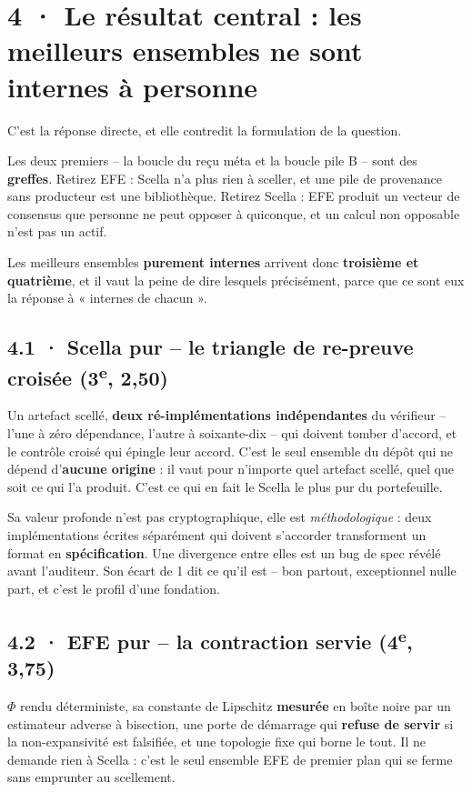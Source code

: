 \documentclass[10pt]{article}
\newcommand{\sz}[1]{{\small\color{grey}\textsf{#1}}}
\begin{document}
\section{4 · Le résultat central : les meilleurs ensembles ne sont internes à personne}

C'est la réponse directe, et elle contredit la formulation de la question.

Les deux premiers -- la boucle du reçu méta et la boucle pile B -- sont des \textbf{greffes}. Retirez
EFE : Scella n'a plus rien à sceller, et une pile de provenance sans producteur est une bibliothèque.
Retirez Scella : EFE produit un vecteur de consensus que personne ne peut opposer à quiconque, et un
calcul non opposable n'est pas un actif.

Les meilleurs ensembles \textbf{purement internes} arrivent donc \textbf{troisième et quatrième}, et il
vaut la peine de dire lesquels précisément, parce que ce sont eux la réponse à « internes de chacun ».

\subsection{4.1 · Scella pur -- le triangle de re-preuve croisée \sz{(3\textsuperscript{e}, 2,50)}}

Un artefact scellé, \textbf{deux ré-implémentations indépendantes} du vérifieur -- l'une à zéro
dépendance, l'autre à soixante-dix -- qui doivent tomber d'accord, et le contrôle croisé qui épingle
leur accord. C'est le seul ensemble du dépôt qui ne dépend d'\textbf{aucune origine} : il vaut pour
n'importe quel artefact scellé, quel que soit ce qui l'a produit. C'est ce qui en fait le Scella le plus
pur du portefeuille.

Sa valeur profonde n'est pas cryptographique, elle est \emph{méthodologique} : deux implémentations
écrites séparément qui doivent s'accorder transforment un format en \textbf{spécification}. Une
divergence entre elles est un bug de spec révélé avant l'auditeur. Son écart de 1 dit ce qu'il est --
bon partout, exceptionnel nulle part, et c'est le profil d'une fondation.

\subsection{4.2 · EFE pur -- la contraction servie \sz{(4\textsuperscript{e}, 3,75)}}

$\Phi$ rendu déterministe, sa constante de Lipschitz \textbf{mesurée} en boîte noire par un estimateur
adverse à bisection, une porte de démarrage qui \textbf{refuse de servir} si la non-expansivité est
falsifiée, et une topologie fixe qui borne le tout. Il ne demande rien à Scella : c'est le seul
ensemble EFE de premier plan qui se ferme sans emprunter au scellement.
\end{document}
